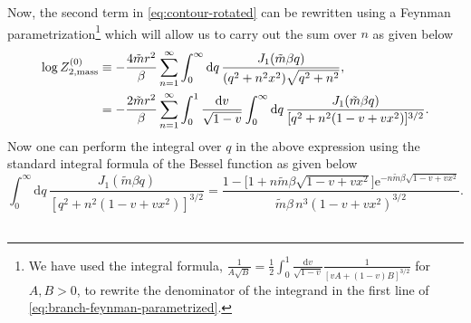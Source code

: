 \documentclass[a4paper,11pt]{article}
\newcommand{\e}{\mathrm e}
\newcommand{\dd}{\mathrm d}
\begin{document}
Now, the second term in \eqref{eq:contour-rotated} can be rewritten using a
Feynman parametrization\footnote{We have used the integral formula,
$\displaystyle
 \frac{1}{A\sqrt B}
 =\frac12\int_0^1\frac{\dd v}{\sqrt{1-v}}
 \frac{1}{[vA+(1-v)B]^{3/2}}$ for $A,B>0$, to rewrite the denominator of the integrand in the first line of \eqref{eq:branch-feynman-parametrized}. } which will allow us to carry out the sum over $n$ as given below 
\begin{align}
 \log Z_{2,{\rm mass}}^{(0)}
 &\equiv-\frac{4\tilde m r^2}{\beta}
 \sum_{n=1}^{\infty}\int_0^{\infty}\dd q\,
 \frac{J_1(\tilde m\beta q)}{(q^2+n^2x^2)\sqrt{q^2+n^2}}
 \nonumber,\\
 &=-\frac{2\tilde m r^2}{\beta}
 \sum_{n=1}^{\infty}\int_0^1\frac{\dd v}{\sqrt{1-v}}
 \int_0^\infty\dd q\,
 \frac{J_1(\tilde m\beta q)}
 {[q^2+n^2(1-v+vx^2)]^{3/2}}.
 \label{eq:branch-feynman-parametrized}
\end{align}
Now one can perform the integral over $q$ in the above expression using the standard integral formula of the Bessel function as given below
\begin{equation}
 \int_0^\infty\dd q\,
 \frac{J_1(\tilde m\beta q)}
 {[q^2+n^2(1-v+vx^2)]^{3/2}}
 =\frac{
  1-\bigl[1+n\tilde m\beta\sqrt{1-v+vx^2}\bigr]
  \e^{-n\tilde m\beta\sqrt{1-v+vx^2}}
 }{\tilde m\beta\,n^3(1-v+vx^2)^{3/2}}.
 \label{eq:J1-integral}
\end{equation}
\\
\end{document}
